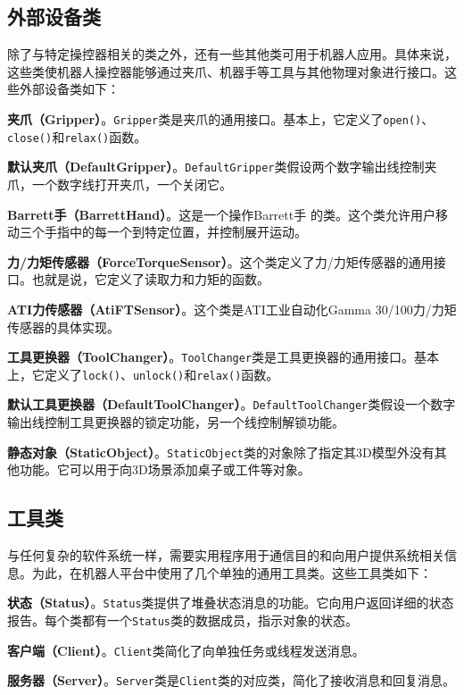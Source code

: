 \documentclass[UTF8,a4paper,12pt]{ctexart}
\begin{document}
\subsection{外部设备类}

除了与特定操控器相关的类之外，还有一些其他类可用于机器人应用。具体来说，这些类使机器人操控器能够通过夹爪、机器手等工具与其他物理对象进行接口。这些外部设备类如下：

\textbf{夹爪（Gripper）}。\texttt{Gripper}类是夹爪的通用接口。基本上，它定义了\texttt{open()}、\texttt{close()}和\texttt{relax()}函数。

\textbf{默认夹爪（DefaultGripper）}。\texttt{DefaultGripper}类假设两个数字输出线控制夹爪，一个数字线打开夹爪，一个关闭它。

\textbf{Barrett手（BarrettHand）}。这是一个操作Barrett手 \cite{Barrett} 的类。这个类允许用户移动三个手指中的每一个到特定位置，并控制展开运动。

\textbf{力/力矩传感器（ForceTorqueSensor）}。这个类定义了力/力矩传感器的通用接口。也就是说，它定义了读取力和力矩的函数。

\textbf{ATI力传感器（AtiFTSensor）}。这个类是ATI工业自动化Gamma 30/100力/力矩传感器的具体实现。

\textbf{工具更换器（ToolChanger）}。\texttt{ToolChanger}类是工具更换器的通用接口。基本上，它定义了\texttt{lock()}、\texttt{unlock()}和\texttt{relax()}函数。

\textbf{默认工具更换器（DefaultToolChanger）}。\texttt{DefaultToolChanger}类假设一个数字输出线控制工具更换器的锁定功能，另一个线控制解锁功能。

\textbf{静态对象（StaticObject）}。\texttt{StaticObject}类的对象除了指定其3D模型外没有其他功能。它可以用于向3D场景添加桌子或工件等对象。

\subsection{工具类}

与任何复杂的软件系统一样，需要实用程序用于通信目的和向用户提供系统相关信息。为此，在机器人平台中使用了几个单独的通用工具类。这些工具类如下：

\textbf{状态（Status）}。\texttt{Status}类提供了堆叠状态消息的功能。它向用户返回详细的状态报告。每个类都有一个\texttt{Status}类的数据成员，指示对象的状态。

\textbf{客户端（Client）}。\texttt{Client}类简化了向单独任务或线程发送消息。

\textbf{服务器（Server）}。\texttt{Server}类是\texttt{Client}类的对应类，简化了接收消息和回复消息。
\end{document}
